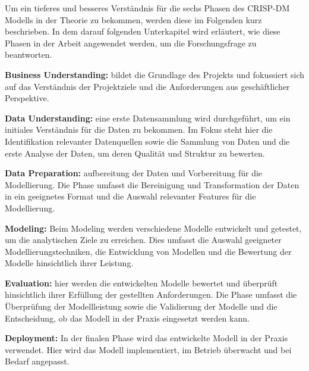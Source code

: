 Um ein tieferes und besseres Verständnis für die sechs Phasen des CRISP-DM Modells in der Theorie zu bekommen, werden diese im Folgenden kurz beschrieben. In dem darauf folgenden Unterkapitel wird erläutert, wie diese Phasen in der Arbeit angewendet werden, um die Forschungsfrage zu beantworten.

\textbf{Business Understanding:} bildet die Grundlage des Projekts und fokussiert sich auf das Verständnis der Projektziele und die Anforderungen aus geschäftlicher Perspektive.

\textbf{Data Understanding:} eine erste Datensammlung wird durchgeführt, um ein initiales Verständnis für die Daten zu bekommen. Im Fokus steht hier die Identifikation relevanter Datenquellen sowie die Sammlung von Daten und die erste Analyse der Daten, um deren Qualität und Struktur zu bewerten.

\textbf{Data Preparation:} aufbereitung der Daten und Vorbereitung für die Modellierung. Die Phase umfasst die Bereinigung und Transformation der Daten in ein geeignetes Format und die Auswahl relevanter Features für die Modellierung.

\textbf{Modeling:} Beim Modeling werden verschiedene Modelle entwickelt und getestet, um die analytischen Ziele zu erreichen. Dies umfasst die Auswahl geeigneter Modellierungstechniken, die Entwicklung von Modellen und die Bewertung der Modelle hinsichtlich ihrer Leistung.

\textbf{Evaluation:} hier werden die entwickelten Modelle bewertet und überprüft hinsichtlich ihrer Erfüllung der gestellten Anforderungen. Die Phase umfasst die Überprüfung der Modellleistung sowie die Validierung der Modelle und die Entscheidung, ob das Modell in der Praxis eingesetzt werden kann.

\textbf{Deployment:} In der finalen Phase wird das entwickelte Modell in der Praxis verwendet. Hier wird das Modell implementiert, im Betrieb überwacht und bei Bedarf angepasst.